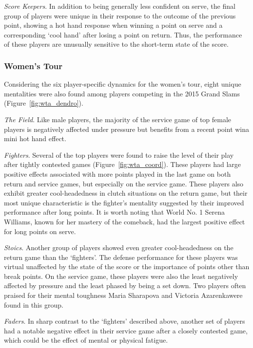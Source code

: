 \documentclass{Latex/svjour3}
\begin{document}
\textit{Score Keepers}. In addition to being generally less confident
on serve, the final group of players were unique in
their response to the outcome of the previous point, showing a hot
hand response when winning a point on serve and a corresponding `cool
hand' after losing a point on return. Thus, the performance of these
players are unusually sensitive to the short-term state of the score. 

\subsubsection{Women's Tour}

Considering the six player-specific dynamics for the women's tour, eight unique mentalities were also found among players competing
in the 2015 Grand Slams (Figure~\ref{fig:wta_dendro}). 

\textit{The Field}. Like male players, the majority of the service
game of top female
players is negatively affected under pressure but benefits from a
recent point win\textemdash a mini hot hand effect. 

\textit{Fighters}. Several of the top players were found to raise the level of
their play after tightly contested games (Figure~\ref{fig:wta_coord}). These players had large
positive effects associated with more points played in the last game
on both return and service games, but especially on the service
game. These players also exhibit greater cool-headedness in clutch
situations on the return game, but their most unique characteristic is
the fighter's mentality suggested by their improved performance after
long points. It is worth noting that World No. 1 Serena Williams,
known for her mastery of the comeback, had
the largest positive effect for long points on serve. 

\textit{Stoics}. Another group of players
showed even greater cool-headedness on the return game than the
`fighters'. The defense performance for these players was virtual
unaffected by the state of the score or the importance of points other
than break points. On the service game, these players were also the least
negatively affected by pressure and the least phased by being a set
down. Two players often praised for their mental toughness\textemdash
Maria Sharapova and Victoria Azarenka\textemdash were found in this
group.

\textit{Faders}. In sharp contrast to the `fighters' described above,
another set of players had a notable negative effect in their service
game after a closely contested game, which could be the effect of mental or
physical fatigue. 
\end{document}
